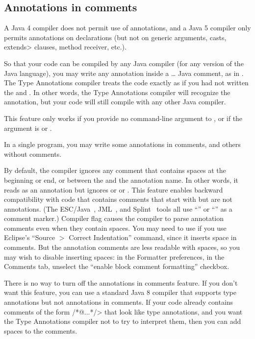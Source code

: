 \subsection{Annotations in comments\label{annotations-in-comments}}

A Java 4 compiler does not permit use of
annotations, and a Java 5 compiler only permits annotations on
declarations (but not on generic arguments, casts, \<extends> clauses, method receiver, etc.).

So that your code can be compiled by any Java compiler (for any version of
the Java language), you may write any annotation inside a
\code{/*}\ldots\code{*/} Java comment, as in .
The Type Annotations compiler treats the code exactly as if you had not written the
\code{/*} and \code{*/}.
In other words, the Type Annotations compiler will recognize the
annotation, but your code will still compile with any other Java compiler.

This feature only works if you provide no  command-line
argument to , or if the  argument is 
or .

In a single program, you may write some annotations in comments, and others
without comments.

By default, the compiler ignores any comment that contains spaces at the
beginning or end, or between the  and the annotation name.
In other words, it reads  as an annotation but ignores
 or  or .
This
feature enables backward compatibility with code that contains comments
that start with  but are not annotations.  (The
ESC/Java~\cite{FlanaganLLNSS02}, JML~\cite{LeavensBR2006:JML}, and
Splint~\cite{Evans96} tools all use ``'' or ``'' as a
comment marker.)
Compiler flag
 causes the compiler to parse annotation comments
even when they contain spaces.  You may need to use
 if you use Eclipse's ``Source $>$ Correct
Indentation'' command, since it inserts space in comments.  But the
annotation comments are less readable with spaces, so you may wish to disable
inserting spaces:  in the Formatter preferences, in the Comments tab,
unselect the ``enable block comment formatting'' checkbox.

There is no way to turn off the annotations in comments feature.  If you
don't want this feature, you can use a standard Java 8 compiler that
supports type annotations but not annotations in comments.  If your code
already contains comments of the form \</*@...*/> that look like type
annotations, and you want the Type Annotations compiler not to try to
interpret them, then you can add spaces to the comments.

